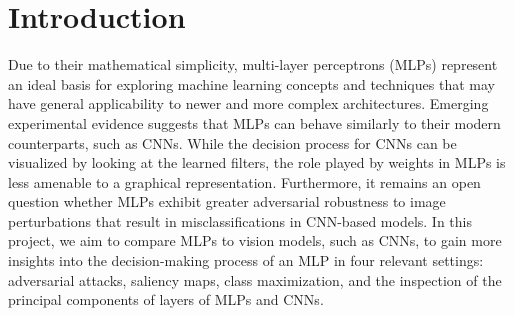 \documentclass{article}
\theoremstyle{plain}
\theoremstyle{definition}
\theoremstyle{remark}
\begin{document}


\section{Introduction}
Due to their mathematical simplicity, multi-layer perceptrons (MLPs) represent an ideal basis for exploring machine learning concepts and techniques that may have general applicability to newer and more complex architectures. Emerging experimental evidence \cite{bachmann2023scaling} suggests that MLPs can behave similarly to their modern counterparts, such as CNNs. While the decision process for CNNs can be visualized by looking at the learned filters, the role played by weights in MLPs is less amenable to a graphical representation. 
Furthermore, it remains an open question whether MLPs exhibit greater adversarial robustness to image perturbations that result in misclassifications in CNN-based models. 
In this project, we aim to compare MLPs to vision models, such as CNNs, to gain more insights into the decision-making process of an MLP in four relevant settings: adversarial attacks, saliency maps, class maximization, and the inspection of the principal components of layers of MLPs and CNNs.
\end{document}
